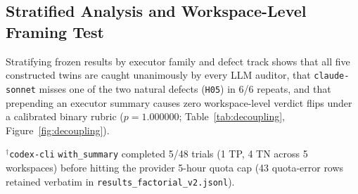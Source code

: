\subsection{Stratified Analysis and Workspace-Level Framing Test}
\label{sec:decoupling}

Stratifying frozen results by executor family and defect track shows that all five constructed twins are caught unanimously by every LLM auditor, that \texttt{claude-sonnet} misses one of the two natural defects (\texttt{H05}) in 6/6 repeats, and that prepending an executor summary causes zero workspace-level verdict flips under a calibrated binary rubric ($p=1.000000$; Table~\ref{tab:decoupling}, Figure~\ref{fig:decoupling}).

\begin{table}[t]
\centering
\caption{\textbf{Frozen stratification isolates natural-defect difficulty and finds zero workspace-level framing flips ($p=1.000000$).} Left: \texttt{path\_only} recall by executor family (3 Haiku defects vs.\ 4 Codex defects) and by defect track (2 natural defects vs.\ 5 constructed twins). Right: paired \texttt{path\_only} (\texttt{PO}) vs.\ \texttt{with\_summary} (\texttt{WS}) comparison using workspace-level majority vote ($n=16$ independent workspaces) to avoid trial pseudo-replication.}
\label{tab:decoupling}
\setlength{\tabcolsep}{3.2pt}
\footnotesize
{}
\vspace{2pt}
\footnotesize{$^\dagger$\texttt{codex-cli} \texttt{with\_summary} completed 5/48 trials (1 TP, 4 TN across 5 workspaces) before hitting the provider 5-hour quota cap (43 quota-error rows retained verbatim in \texttt{results\_factorial\_v2.jsonl}).}
\end{table}

